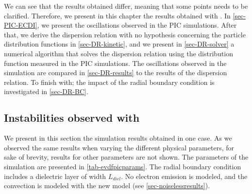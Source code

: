     \vspace{1ex}
    We can see that the results obtained differ, meaning that some points needs to be clarified.
    Therefore, we present in this chapter the results obtained with \LPPic{}.  
    In \cref{sec-PIC-ECDI}, we present the oscillations observed in the \ac{PIC} simulations.
    After that, we derive the dispersion relation with no hypothesis concerning the particle distribution functions in \cref{sec-DR-kinetic}, and we present in \cref{sec-DR-solver} a numerical algorithm that solves the dispersion relation using the distribution function measured in the \ac{PIC} simulations.
    The oscillations observed in the simulation are compared in \cref{sec-DR-results} to the results of the dispersion relation.
    To finish with; the impact of the radial boundary condition is investigated in \cref{sec-DR-BC}.


  \subsection{Instabilities observed with \LPPic} \label{subsec-lppic_ECDI}
  
  We present in this section the simulation results obtained in one case.
  As we observed the same results when varying the  different physical parameters, for sake of brevity, results for other parameters are not shown.
  The parameters of the simulation are presented in \cref{tab-evdfpicparams}.
  The radial boundary condition includes a dielectric layer of width $L_{diel}$.
  No electron emission is modeled, and the convection is modeled with the new model (see \cref{sec-noiselessresults}).
  
